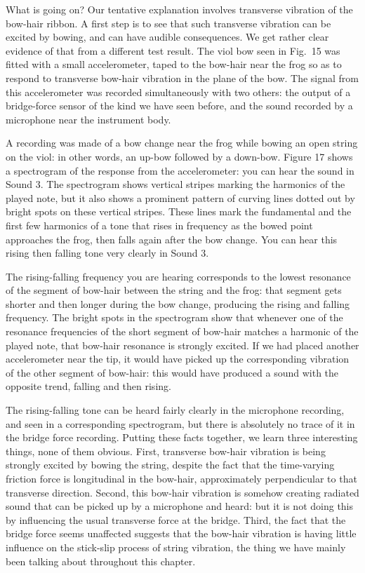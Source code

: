   What is going on? Our tentative explanation involves transverse vibration of 
  the bow-hair ribbon. A first step is to see that such transverse vibration 
  can be excited by bowing, and can have audible consequences. We get rather 
  clear evidence of that from a different test result. The viol bow seen in 
  Fig.\ 15 was fitted with a small accelerometer, taped to the bow-hair near 
  the frog so as to respond to transverse bow-hair vibration in the plane of 
  the bow. The signal from this accelerometer was recorded simultaneously with 
  two others: the output of a bridge-force sensor of the kind we have seen 
  before, and the sound recorded by a microphone near the instrument body. 

  A recording was made of a bow change near the frog while bowing an open 
  string on the viol: in other words, an up-bow followed by a down-bow. Figure 
  17 shows a spectrogram of the response from the accelerometer: you can hear 
  the sound in Sound 3. The spectrogram shows vertical stripes marking the 
  harmonics of the played note, but it also shows a prominent pattern of 
  curving lines dotted out by bright spots on these vertical stripes. These 
  lines mark the fundamental and the first few harmonics of a tone that rises 
  in frequency as the bowed point approaches the frog, then falls again after 
  the bow change. You can hear this rising then falling tone very clearly in 
  Sound 3. 

  The rising-falling frequency you are hearing corresponds to the lowest 
  resonance of the segment of bow-hair between the string and the frog: that 
  segment gets shorter and then longer during the bow change, producing the 
  rising and falling frequency. The bright spots in the spectrogram show that 
  whenever one of the resonance frequencies of the short segment of bow-hair 
  matches a harmonic of the played note, that bow-hair resonance is strongly 
  excited. If we had placed another accelerometer near the tip, it would have 
  picked up the corresponding vibration of the other segment of bow-hair: this 
  would have produced a sound with the opposite trend, falling and then rising. 

  The rising-falling tone can be heard fairly clearly in the microphone 
  recording, and seen in a corresponding spectrogram, but there is absolutely 
  no trace of it in the bridge force recording. Putting these facts together, 
  we learn three interesting things, none of them obvious. First, transverse 
  bow-hair vibration is being strongly excited by bowing the string, despite 
  the fact that the time-varying friction force is longitudinal in the 
  bow-hair, approximately perpendicular to that transverse direction. Second, 
  this bow-hair vibration is somehow creating radiated sound that can be picked 
  up by a microphone and heard: but it is not doing this by influencing the 
  usual transverse force at the bridge. Third, the fact that the bridge force 
  seems unaffected suggests that the bow-hair vibration is having little 
  influence on the stick-slip process of string vibration, the thing we have 
  mainly been talking about throughout this chapter. 

